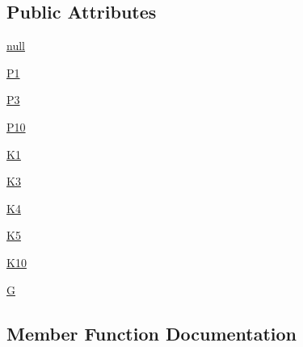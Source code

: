 \subsection*{Public Attributes}
\begin{DoxyCompactItemize}
\item 
\hyperlink{classnetworkx_1_1classes_1_1tests_1_1historical__tests_1_1HistoricalTests_a8061a658116ac6225619c9e940ca7f70}{null}
\item 
\hyperlink{classnetworkx_1_1classes_1_1tests_1_1historical__tests_1_1HistoricalTests_af1262463e733f6f332eb2615ccd63582}{P1}
\item 
\hyperlink{classnetworkx_1_1classes_1_1tests_1_1historical__tests_1_1HistoricalTests_a85ee77c8806a3242b26d676f5cc4a4dd}{P3}
\item 
\hyperlink{classnetworkx_1_1classes_1_1tests_1_1historical__tests_1_1HistoricalTests_a8a013d16f701fe8533858991db8bc715}{P10}
\item 
\hyperlink{classnetworkx_1_1classes_1_1tests_1_1historical__tests_1_1HistoricalTests_ab87a778cd10910b6781b62e3a415d926}{K1}
\item 
\hyperlink{classnetworkx_1_1classes_1_1tests_1_1historical__tests_1_1HistoricalTests_ad04b130f1d5a3510083b6d5b6a2d300a}{K3}
\item 
\hyperlink{classnetworkx_1_1classes_1_1tests_1_1historical__tests_1_1HistoricalTests_a2deec88f342348c3046b26a0cab894b2}{K4}
\item 
\hyperlink{classnetworkx_1_1classes_1_1tests_1_1historical__tests_1_1HistoricalTests_a2223e4e8394117cd86122be3f69bb2ea}{K5}
\item 
\hyperlink{classnetworkx_1_1classes_1_1tests_1_1historical__tests_1_1HistoricalTests_adb6528bb62ffd19982130541c55d2286}{K10}
\item 
\hyperlink{classnetworkx_1_1classes_1_1tests_1_1historical__tests_1_1HistoricalTests_abb434d6e8701ad65a5460462c824b365}{G}
\end{DoxyCompactItemize}


\subsection{Member Function Documentation}
\mbox{\label{classnetworkx_1_1classes_1_1tests_1_1historical__tests_1_1HistoricalTests_ad727a85cc5672e22bb56ac598aa5db71}} 
